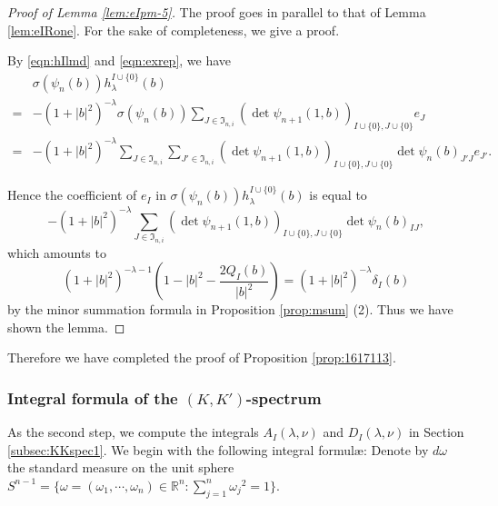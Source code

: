 \begin{proof}
[Proof of Lemma \ref{lem:eIpm-5}]
The proof goes in parallel to that of Lemma \ref{lem:eIRone}.  
For the sake of completeness, 
 we give a proof.  


By \eqref{eqn:hIlmd} and \eqref{eqn:exrep}, 
we have
\begin{align*}
&\sigma(\psi_n(b)) h_{\lambda}^{I \cup \{0\}}(b)
\\
=& -(1+|b|^2)^{-\lambda}
  \sigma(\psi_n(b))
  \sum_{J \in {\mathfrak{I}}_{n,i}}
  (\det \psi_{n+1}(1,b))_{I \cup \{0\}, J \cup \{0\}} e_J
\\
=& -(1+|b|^2)^{-\lambda}
  \sum_{J \in {\mathfrak{I}}_{n,i}}
  \sum_{J' \in {\mathfrak{I}}_{n,i}}
  (\det \psi_{n+1}(1,b))_{I \cup \{0\}, J \cup \{0\}}
  \det \psi_n(b)_{J' J}e_{J'}.  
\end{align*}



Hence the coefficient of $e_I$
 in $\sigma(\psi_n(b)) h_{\lambda}^{I \cup \{0\}}(b)$
 is equal to 
\begin{equation*}
  - (1+|b|^2)^{-\lambda}
  \sum_{J \in {\mathfrak{I}}_{n,i}}
  (\det \psi_{n+1}(1,b))_{I \cup \{0\}, J \cup \{0\}}
   \det \psi_n(b)_{I J}, 
\end{equation*}
which amounts to 
\[
  (1+|b|^2)^{-\lambda-1}(1-|b|^2-\frac{2Q_I(b)}{|b|^2})
  =
 (1+|b|^2)^{-\lambda} \delta_I(b)
\]
by the minor summation formula
 in Proposition \ref{prop:msum} (2).  
Thus we have shown the lemma.  
\end{proof}

Therefore we have completed the proof of Proposition \ref{prop:1617113}.  



\subsubsection{Integral formula of the $(K,K')$-spectrum}
\label{subsec:KKspec2}
As the second step,
 we compute the integrals
 $A_I(\lambda,\nu)$ and $D_I(\lambda,\nu)$
 in Section \ref{subsec:KKspec1}.  
We begin with the following integral formul{\ae}:
Denote by $d \omega$ the standard measure
 on the unit sphere $S^{n-1}=\{\omega=(\omega_1, \cdots, \omega_n) \in {\mathbb{R}}^n:
\sum_{j=1}^{n} {\omega_j}^2=1\}$.  




